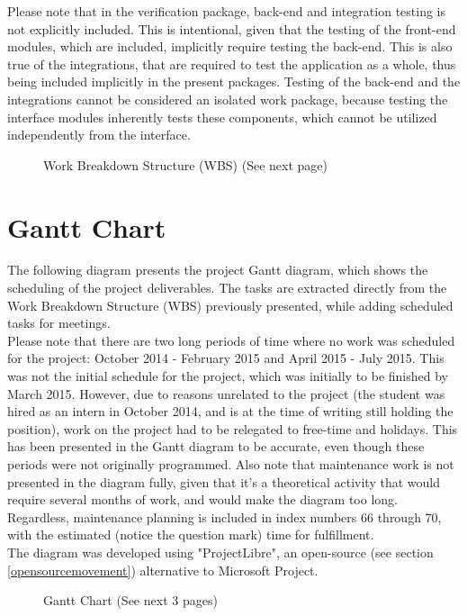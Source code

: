 Please note that in the verification package, back-end and integration testing is not explicitly included. This is 
intentional, given that the testing of the front-end modules, which are included, implicitly require testing the back-end. 
This is also true of the integrations, that are required to test the application as a whole, thus being included implicitly 
in the present packages. Testing of the back-end and the integrations cannot be considered an isolated work package, because 
testing the interface modules inherently tests these components, which cannot be utilized independently from the interface.
\begin{figure}[H]
\caption{Work Breakdown Structure (WBS) (See next page)\label{wbs}}
\end{figure}

\section{Gantt Chart}
The following diagram presents the project Gantt diagram, which shows the scheduling of the project deliverables. The tasks 
are extracted directly from the Work Breakdown Structure (WBS) previously presented, while adding scheduled tasks for 
meetings.\\

Please note that there are two long periods of time where no work was scheduled for the project: October 2014 - February 
2015 and April 2015 - July 2015. This was not the initial schedule for the project, which was initially to be finished by 
March 2015. However, due to reasons unrelated to the project (the student was hired as an intern in October 2014, and is at 
the time of writing still holding the position), work on the project had to be relegated to free-time and holidays. This 
has been presented in the Gantt diagram to be accurate, even though these periods were not originally programmed. Also note 
that maintenance work is not presented in the diagram fully, given that it's a theoretical activity that would require 
several months of work, and would make the diagram too long. Regardless, maintenance planning is included in index numbers 
66 through 70, with the estimated (notice the question mark) time for fulfillment.\\

The diagram was developed using "ProjectLibre", an open-source (see section \ref{opensourcemovement}) alternative to 
Microsoft Project.
\begin{figure}[H]
\caption{Gantt Chart (See next 3 pages)\label{gantt}}
\end{figure}

